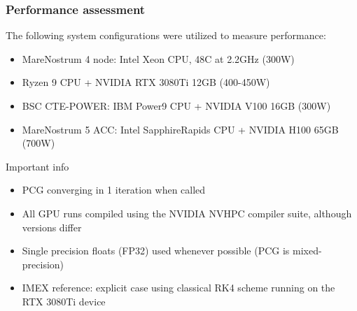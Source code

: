 \begin{frame}
    \frametitle{Performance assessment}
    The following system configurations were utilized to measure performance:
    \begin{itemize}
      \item MareNostrum 4 node: Intel Xeon CPU, 48C at 2.2GHz (300W)
      \item Ryzen 9 CPU + NVIDIA RTX 3080Ti 12GB (400-450W)
      \item BSC CTE-POWER: IBM Power9 CPU + NVIDIA V100 16GB (300W)
      \item MareNostrum 5 ACC: Intel SapphireRapids CPU + NVIDIA H100 65GB (700W)
    \end{itemize}
    \begin{alertblock}{Important info}
      \begin{itemize}
        \item PCG converging in 1 iteration when called
        \item All GPU runs compiled using the NVIDIA NVHPC compiler suite, although versions differ
        \item Single precision floats (FP32) used whenever possible (PCG is mixed-precision)
        \item IMEX reference: explicit case using classical RK4 scheme running on the RTX 3080Ti device
      \end{itemize}
    \end{alertblock}
\end{frame}

